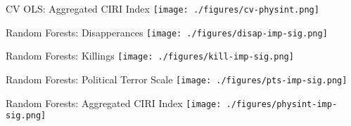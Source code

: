 \documentclass{beamer}
\begin{document}
\begin{frame}{CV OLS: Aggregated CIRI Index}
  \centering
  \texttt{[image: ./figures/cv-physint.png]}
\end{frame}

\begin{frame}{Random Forests: Disapperances}
  \centering
  \texttt{[image: ./figures/disap-imp-sig.png]}
\end{frame}

\begin{frame}{Random Forests: Killings}
  \centering
  \texttt{[image: ./figures/kill-imp-sig.png]}
\end{frame}

\begin{frame}{Random Forests: Political Terror Scale}
  \centering
  \texttt{[image: ./figures/pts-imp-sig.png]}
\end{frame}

\begin{frame}{Random Forests: Aggregated CIRI Index}
  \centering
  \texttt{[image: ./figures/physint-imp-sig.png]}
\end{frame}
\end{document}
